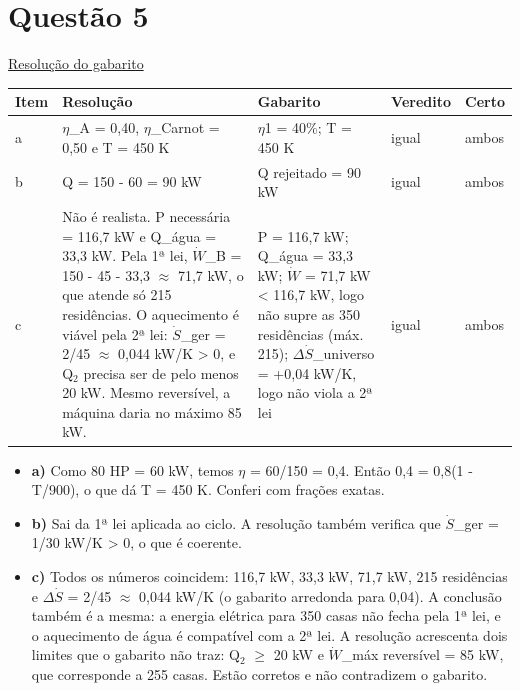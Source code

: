 \documentclass{article}%
\begin{document}
\section*{Questão 5}%
\href{https://poliedroresolve.sistemapoliedro.com.br/vestibulares/ime/2027/ime-2-fase-dia-2-27-10-2026-2-fase-dia-2/dissertativa-5-fisica-2-fase-dia-2-ime-2027}{Resolução do gabarito}\par\smallskip%
\begin{longtable}{@{}p{} p{} p{} p{} p{}@{}}\toprule Item & Resolução & Gabarito & Veredito & Certo \\ \midrule
a & $\eta$\_A = 0,40, $\eta$\_Carnot = 0,50 e T = 450 K & $\eta$1 = 40\%; T = 450 K & igual & ambos \\
b & Q = 150 - 60 = 90 kW & Q rejeitado = 90 kW & igual & ambos \\
c & Não é realista. P necessária = 116,7 kW e Q\_água = 33,3 kW. Pela 1ª lei, $\dot W$\_B = 150 - 45 - 33,3 $\approx$ 71,7 kW, o que atende só 215 residências. O aquecimento é viável pela 2ª lei: $\dot S$\_ger = 2/45 $\approx$ 0,044 kW/K > 0, e Q$_{2}$ precisa ser de pelo menos 20 kW. Mesmo reversível, a máquina daria no máximo 85 kW. & P = 116,7 kW; Q\_água = 33,3 kW; $\dot W$ = 71,7 kW < 116,7 kW, logo não supre as 350 residências (máx. 215); $\Delta$$\dot S$\_universo = +0,04 kW/K, logo não viola a 2ª lei & igual & ambos \\
\bottomrule\end{longtable}%
\begin{itemize}%
\item%
\textbf{a)} Como 80 HP = 60 kW, temos $\eta$ = 60/150 = 0,4. Então 0,4 = 0,8(1 - T/900), o que dá T = 450 K. Conferi com frações exatas.%
\item%
\textbf{b)} Sai da 1ª lei aplicada ao ciclo. A resolução também verifica que $\dot S$\_ger = 1/30 kW/K > 0, o que é coerente.%
\item%
\textbf{c)} Todos os números coincidem: 116,7 kW, 33,3 kW, 71,7 kW, 215 residências e $\Delta$$\dot S$ = 2/45 $\approx$ 0,044 kW/K (o gabarito arredonda para 0,04). A conclusão também é a mesma: a energia elétrica para 350 casas não fecha pela 1ª lei, e o aquecimento de água é compatível com a 2ª lei. A resolução acrescenta dois limites que o gabarito não traz: Q$_{2}$ $\geq$ 20 kW e $\dot W$\_máx reversível = 85 kW, que corresponde a 255 casas. Estão corretos e não contradizem o gabarito.%
\end{itemize}%
\end{document}
